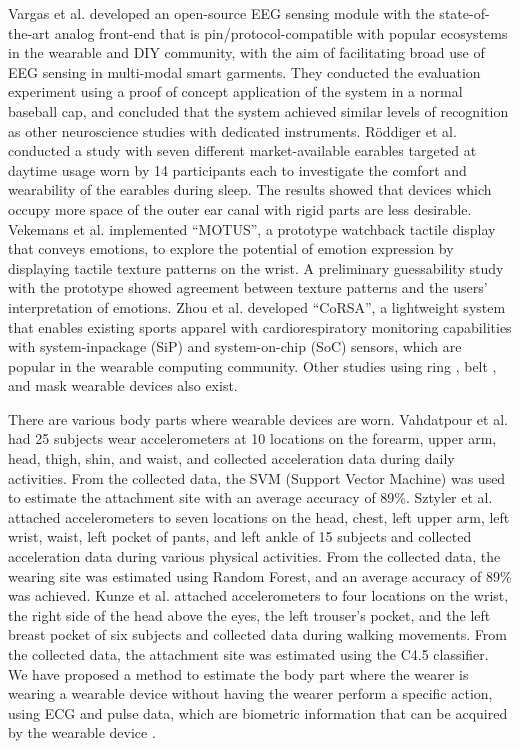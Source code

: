 \documentclass[sigchi,authordraft]{acmart}
\begin{document}
Vargas et al. \cite{Brainwear} developed an open-source EEG sensing module with the state-of-the-art analog front-end that is pin/protocol-compatible with popular ecosystems in the wearable and DIY community, with the aim of facilitating broad use of EEG sensing in multi-modal smart garments. They conducted the evaluation experiment using a proof of concept application of the system in a normal baseball cap, and concluded that the system achieved similar levels of recognition as other neuroscience studies with dedicated instruments.
R\"{o}ddiger et al. \cite{earables} conducted a study with seven different market-available earables targeted at daytime usage worn by 14 participants each to investigate the comfort and wearability of the earables during sleep. The results showed that devices which occupy more space of the outer ear canal with rigid parts are less desirable.
Vekemans et al. \cite{MOTUS} implemented ``MOTUS'', a prototype watchback tactile display that conveys emotions, to explore the potential of emotion expression by displaying tactile texture patterns on the wrist. A preliminary guessability study with the prototype showed agreement between texture patterns and the users' interpretation of emotions.
Zhou et al. \cite{CoRSA} developed ``CoRSA'', a lightweight system that enables existing sports apparel with cardiorespiratory monitoring capabilities with system-inpackage (SiP) and system-on-chip (SoC) sensors, which are popular in the wearable computing community.
Other studies using ring \cite{wearable_ring1, wearable_ring2, TypingRing, ElectroRing}, belt \cite{wearable_belt1, SmartBelt, WaistonBeltX, wearable_belt2}, and mask \cite{wearable_mask1, wearable_mask2, SilentMask, Masquare} wearable devices also exist.\par

There are various body parts where wearable devices are worn.
Vahdatpour et al. \cite{localization_vahdatpour} had 25 subjects wear accelerometers at 10 locations on the forearm, upper arm, head, thigh, shin, and waist, and collected acceleration data during daily activities. From the collected data, the SVM (Support Vector Machine) was used to estimate the attachment site with an average accuracy of 89\%.
Sztyler et al. \cite{localization_sztyler} attached accelerometers to seven locations on the head, chest, left upper arm, left wrist, waist, left pocket of pants, and left ankle of 15 subjects and collected acceleration data during various physical activities. From the collected data, the wearing site was estimated using Random Forest, and an average accuracy of 89\% was achieved.
Kunze et al. \cite{localization_kunze} attached accelerometers to four locations on the wrist, the right side of the head above the eyes, the left trouser’s pocket, and the left breast pocket of six subjects and collected data during walking movements. From the collected data, the attachment site was estimated using the C4.5 classifier.
We have proposed a method to estimate the body part where the wearer is wearing a wearable device without having the wearer perform a specific action, using ECG and pulse data, which are biometric information that can be acquired by the wearable device \cite{localization_yoshida}.\par
\end{document}
